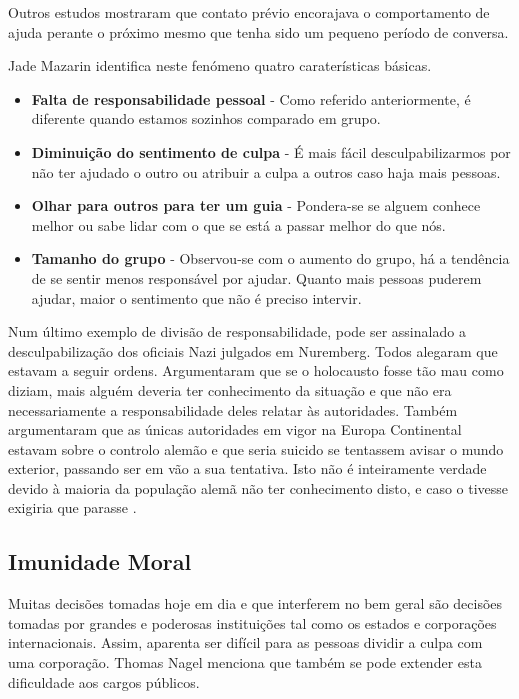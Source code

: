 \documentclass[a4paper,onecolumn,11pt]{article}
\begin{document}
	Outros estudos mostraram que contato prévio encorajava o comportamento de ajuda perante o próximo mesmo que tenha sido um pequeno período de conversa.

	Jade Mazarin \cite{jade} identifica neste fenómeno quatro caraterísticas básicas.
	\begin{itemize}
		\item\textbf{ Falta de responsabilidade pessoal}  - Como referido anteriormente, é diferente quando estamos sozinhos comparado em grupo.
		\item \textbf{Diminuição do sentimento de culpa} - É mais fácil desculpabilizarmos por não ter ajudado o outro ou atribuir a culpa a outros caso haja mais pessoas.
		\item \textbf{Olhar para outros para ter um guia} - Pondera-se se alguem conhece melhor ou sabe lidar  com o que se está a passar melhor do que nós.
		\item \textbf{Tamanho do grupo} - Observou-se com o aumento do grupo, há a tendência de se sentir menos responsável por ajudar. Quanto mais pessoas puderem ajudar, maior o sentimento que não é preciso intervir.
	\end{itemize}

	Num último exemplo de divisão de responsabilidade, pode ser assinalado a desculpabilização dos oficiais Nazi julgados em Nuremberg. Todos alegaram que estavam a seguir ordens. Argumentaram que se o holocausto fosse tão mau como diziam, mais alguém deveria ter conhecimento da situação e que não era necessariamente a responsabilidade deles relatar às autoridades. Também argumentaram que as únicas autoridades em vigor na Europa Continental estavam sobre o controlo alemão e que seria suicido se tentassem avisar o mundo exterior, passando ser em vão a sua tentativa.
	Isto não é inteiramente verdade devido à maioria da população alemã não ter conhecimento disto, e caso o tivesse exigiria que parasse \cite{10cases}.

	

	\subsection{Imunidade Moral}
		Muitas decisões tomadas hoje em dia e que interferem no bem geral são decisões tomadas por grandes e poderosas instituições tal como os estados e corporações internacionais. Assim, aparenta ser difícil para as pessoas dividir a culpa com uma corporação. Thomas Nagel menciona que também se pode extender esta dificuldade aos cargos públicos.
	
\end{document}
